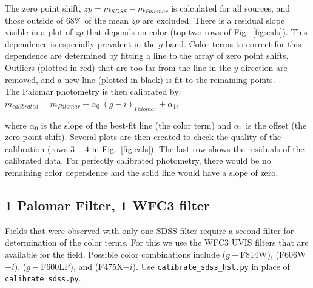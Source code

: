 \documentclass{article}
\begin{document}
\noindent The zero point shift, $zp = m_{SDSS} - m_{Palomar}$ 
is calculated for all sources, and those outside of $68\%$ of the
mean $zp$ are excluded. There is a residual slope visible in a plot of 
$zp$ that depends on color (top two rows of Fig.~\ref{fig:cals}).
This dependence is especially prevalent in the $g$ band.
Color terms to correct for this dependence 
are determined by fitting a line to the array of 
zero point shifts. Outliers (plotted in red) that are too far from the 
line in the 
$y$-direction are removed, and a new line (plotted in black) 
is fit to the remaining points. \\

\noindent The Palomar photometry is then calibrated by:\\
\indent $m_{calibrated} = m_{Palomar} + \alpha_0~(g-i)_{Palomar} + \alpha_1$,

\noindent where $\alpha_0$ is the slope of the best-fit line (the color term)
and $\alpha_1$ is the offset (the zero point shift). Several plots
are then created to check the quality of the calibration (rows $3-4$ in 
Fig.~\ref{fig:cals}). The last row shows the residuals of the calibrated 
data. For perfectly calibrated photometry, there would be no remaining
color dependence and the solid line would have a slope of zero.

\subsection{1 Palomar Filter, 1 WFC3 filter}
Fields that were observed with only one SDSS filter require a second
filter for determination of the color terms. For this we use the WFC3
UVIS filters that are available for the field. Possible color combinations
include ($g-$F814W), (F606W$-i$), ($g-$F600LP), and (F475X$-i$).
Use \texttt{calibrate\_sdss\_hst.py} in place of 
\texttt{calibrate\_sdss.py}.
\end{document}
